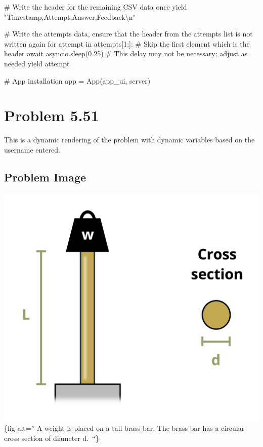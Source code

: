 \documentclass[
  letterpaper,
  DIV=11,
  numbers=noendperiod]{scrreprt}
\newenvironment{Shaded}{\begin{snugshade}}{\end{snugshade}}
\newcommand{\NormalTok}[1]{\textcolor[rgb]{0.00,0.23,0.31}{#1}}
\begin{document}
\begin{Shaded}
\begin{Highlighting}[]
\NormalTok{        \# Write the header for the remaining CSV data once}
\NormalTok{        yield "Timestamp,Attempt,Answer,Feedback\textbackslash{}n"}
        
\NormalTok{        \# Write the attempts data, ensure that the header from the attempts list is not written again}
\NormalTok{        for attempt in attempts[1:]:  \# Skip the first element which is the header}
\NormalTok{            await asyncio.sleep(0.25)  \# This delay may not be necessary; adjust as needed}
\NormalTok{            yield attempt}


\NormalTok{\# App installation}
\NormalTok{app = App(app\_ui, server)}
\end{Highlighting}
\end{Shaded}

\chapter*{Problem 5.51}\label{problem-5.51}


This is a dynamic rendering of the problem with dynamic variables based
on the username entered.

\section*{Problem Image}\label{problem-image-54}


\includegraphics{images/223.png}\{fig-alt='' A weight is placed on a
tall brass bar. The brass bar has a circular cross section of diameter
d.~``\}
\end{document}
